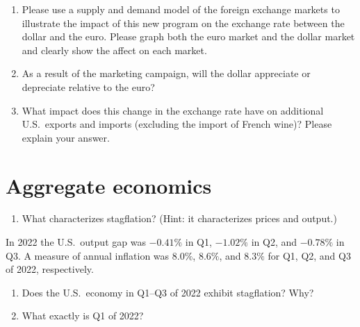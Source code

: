 \documentclass[
    letterpaper,paper=portrait,fleqn,
    DIV=16,fontsize=12pt,twoside=semi,
    parskip=full-,
    headings=standardclasses]
{scrartcl}
\begin{document}
\begin{enumerate}[resume]

\item Please use a supply and demand model of the foreign exchange markets to illustrate the impact of this new program on the exchange rate between the dollar and the euro. Please graph both the euro market and the dollar market and clearly show the affect on each market.

\vfill

\item As a result of the marketing campaign, will the dollar appreciate or depreciate relative to the euro?

\vspace{2.0\baselineskip}

\item What impact does this change in the exchange rate have on additional U.S.~exports and imports (excluding the import of French wine)? Please explain your answer.

\vspace{6.0\baselineskip}

\end{enumerate}

\clearpage

\section{Aggregate economics}

\begin{enumerate}

\item What characterizes stagflation? (Hint: it characterizes prices and output.)

\vfill

\end{enumerate}

In 2022 the U.S.~output gap was $-0.41\%$ in Q1, $-1.02\%$ in Q2, and $-0.78\%$ in Q3. A measure of annual inflation was $8.0\%$, $8.6\%$, and $8.3\%$ for Q1, Q2, and Q3 of 2022, respectively.

\begin{enumerate}[resume]

\item Does the U.S.~economy in Q1--Q3 of 2022 exhibit stagflation? Why?

\vfill

\item What exactly is Q1 of 2022?

\vfill

\end{enumerate}
\end{document}
